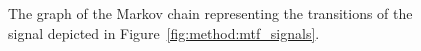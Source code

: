 \begin{figure}
	\centering
	\caption{ The graph of the Markov chain representing the transitions of the signal depicted in Figure~\ref{fig:method:mtf_signals}.}
	\label{fig:method:markov_chain}
\end{figure}
